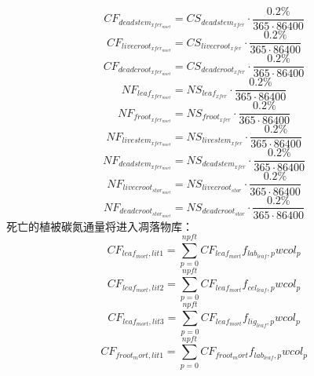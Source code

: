 \begin{equation}
  CF_{deadstem_{{xfer}_{mort}}}=CS_{deadstem_{xfer}}\cdot \frac{0.2\%}{365\cdot 86400}
\end{equation}
\begin{equation}
  CF_{livecroot_{{xfer}_{mort}}}=CS_{livecroot_{xfer}}\cdot \frac{0.2\%}{365\cdot 86400}
\end{equation}
\begin{equation}
  CF_{deadcroot_{{xfer}_{mort}}}=CS_{deadcroot_{xfer}}\cdot \frac{0.2\%}{365\cdot 86400}
\end{equation}
\begin{equation}
  NF_{leaf_{{xfer}_{mort}}}=NS_{leaf_{xfer}}\cdot \frac{0.2\%}{365\cdot 86400}
\end{equation}
\begin{equation}
  NF_{froot_{{xfer}_{mort}}}=NS_{froot_{xfer}}\cdot \frac{0.2\%}{365\cdot 86400}
\end{equation}
\begin{equation}
  NF_{livestem_{{xfer}_{mort}}}=NS_{livestem_{xfer}}\cdot \frac{0.2\%}{365\cdot 86400}
\end{equation}
\begin{equation}
  NF_{deadstem_{{xfer}_{mort}}}=NS_{deadstem_{xfer}}\cdot \frac{0.2\%}{365\cdot 86400}
\end{equation}
\begin{equation}
  NF_{livecroot_{{stor}_{mort}}}=NS_{livecroot_{stor}}\cdot \frac{0.2\%}{365\cdot 86400}
\end{equation}
\begin{equation}
  NF_{deadcroot_{{stor}_{mort}}}=NS_{deadcroot_{stor}}\cdot \frac{0.2\%}{365\cdot 86400}
\end{equation}
死亡的植被碳氮通量将进入凋落物库：
\begin{equation}
CF_{leaf_{mort},lit1}=\sum_{p=0}^{npft}{CF_{leaf_{mort}}f_{lab_{leaf},p}{wcol_p}}
\end{equation}
\begin{equation}
  CF_{leaf_{mort},lit2}=\sum_{p=0}^{npft}{CF_{leaf_{mort}}f_{cel_{leaf},p}{wcol_p}}
\end{equation}
\begin{equation}
  CF_{leaf_{mort},lit3}=\sum_{p=0}^{npft}{CF_{leaf_{mort}}f_{lig_{leaf},p}{wcol_p}}
\end{equation}
\begin{equation}
  CF_{froot_mort,lit1}=\sum_{p=0}^{npft}{CF_{froot_mort}f_{lab_{leaf},p}{wcol_p}}
\end{equation}
